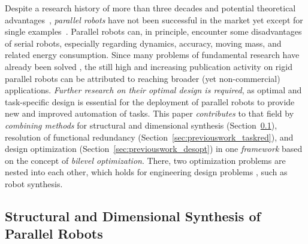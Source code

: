 %
%
%

Despite a research history of more than three decades and potential theoretical advantages~\cite{Merlet2006}, \emph{parallel robots} %
have not been successful in the market yet except for single examples~\cite{RussoZhaLiuXie2024}.
Parallel robots can, in principle, encounter some disadvantages of serial robots, especially regarding dynamics, accuracy, moving mass, and related energy consumption.
Since many problems
%
of fundamental research have already been solved \cite{BriotBur2023,ShaoZhaCar2023,RussoZhaLiuXie2024}, the still high and increasing publication activity on rigid parallel robots can be attributed to reaching broader (yet non-commercial) applications. \emph{Further research on their optimal design is required}, as optimal and task-specific design is essential for the deployment of parallel robots to provide new and improved automation of tasks.
%
%
This paper \emph{contributes} to that field by \emph{combining methods} for structural and dimensional synthesis (Section~\ref{sec:previouswork_parrob}), resolution of functional redundancy (Section~\ref{sec:previouswork_taskred}), and design optimization (Section~\ref{sec:previouswork_desopt}) in one \emph{framework} based on the concept of \emph{bilevel optimization}. There, two optimization problems are nested into each other, which holds for engineering design problems \cite{SinhaMalDeb2017}, such as robot synthesis.

\subsection{Structural and Dimensional Synthesis of Parallel Robots}
\label{sec:previouswork_parrob}

%
%
%
%
%

